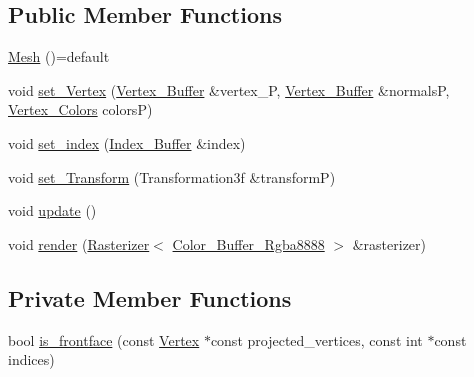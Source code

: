 \subsection*{Public Member Functions}
\begin{DoxyCompactItemize}
\item 
\mbox{\hyperlink{classrenderer_1_1_mesh_a9599aef3cd7b6e8b4643a408445f272b}{Mesh}} ()=default
\item 
void \mbox{\hyperlink{classrenderer_1_1_mesh_a6d48b23fa3c6fd467e15fdd4f12a6f5a}{set\+\_\+\+Vertex}} (\mbox{\hyperlink{classrenderer_1_1_mesh_a8c848a95f65fb25f6dc94dcb8879cf8b}{Vertex\+\_\+\+Buffer}} \&vertex\+\_\+P, \mbox{\hyperlink{classrenderer_1_1_mesh_a8c848a95f65fb25f6dc94dcb8879cf8b}{Vertex\+\_\+\+Buffer}} \&normalsP, \mbox{\hyperlink{classrenderer_1_1_mesh_ab384ccca7ccccac4b935fe797ce0a7ea}{Vertex\+\_\+\+Colors}} colorsP)
\item 
void \mbox{\hyperlink{classrenderer_1_1_mesh_aa2e7ea68a34e4f2f5853136c1efcff7a}{set\+\_\+index}} (\mbox{\hyperlink{classrenderer_1_1_mesh_a6a226cb85370a00787fe01f70a0b5ca2}{Index\+\_\+\+Buffer}} \&index)
\item 
void \mbox{\hyperlink{classrenderer_1_1_mesh_acaed062c3d1abf115f22f7dba87ed69c}{set\+\_\+\+Transform}} (Transformation3f \&transformP)
\item 
void \mbox{\hyperlink{classrenderer_1_1_mesh_a794be273829e332a1ba81d9f5af3b60e}{update}} ()
\item 
void \mbox{\hyperlink{classrenderer_1_1_mesh_a09c57a296515d4db731b2aa0f4eba284}{render}} (\mbox{\hyperlink{classrenderer_1_1_rasterizer}{Rasterizer}}$<$ \mbox{\hyperlink{classrenderer_1_1_color___buffer___rgba8888}{Color\+\_\+\+Buffer\+\_\+\+Rgba8888}} $>$ \&rasterizer)
\end{DoxyCompactItemize}
\subsection*{Private Member Functions}
\begin{DoxyCompactItemize}
\item 
bool \mbox{\hyperlink{classrenderer_1_1_mesh_a693d10fdfac269136fe703a53a7cc27e}{is\+\_\+frontface}} (const \mbox{\hyperlink{classrenderer_1_1_mesh_ab0cb2995275ebaa8ae9e5fbb5519b7f3}{Vertex}} $\ast$const projected\+\_\+vertices, const int $\ast$const indices)
\end{DoxyCompactItemize}
